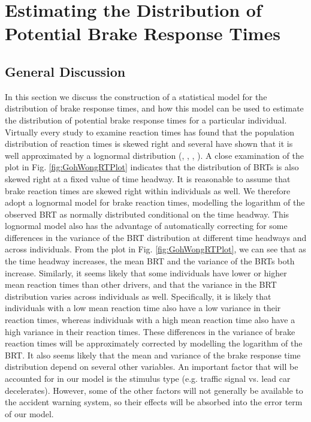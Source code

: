 \documentclass[conference]{IEEEtran}
\begin{document}
\section{Estimating the Distribution of Potential Brake Response Times}
\label{estimation}

\subsection{General Discussion}

In this section we discuss the construction of a statistical model for the distribution of brake response times, and how this model can be used to estimate the distribution of potential brake response times for a particular individual.
Virtually every study to examine reaction times has found that the population distribution of reaction times is skewed right and several have shown that it is well approximated by a lognormal distribution (\cite{GohWong:DriverPRTDuringSignalChange}, \cite{Koppa:HumanFactors}, \cite{MaxwellWood:ReviewTrafficSignal},
\cite{ZhangBham:EstDriverRT}).  A close examination of the plot in Fig. \ref{fig:GohWongRTPlot} indicates that the distribution of BRTs is also skewed right at a fixed value of time headway.
It is reasonable to assume that brake reaction times are skewed right within individuals as well.  We therefore adopt a lognormal model for brake reaction times, modelling the logarithm of the observed BRT as normally distributed conditional on the time headway.
This lognormal model also has the advantage of automatically correcting for some differences in the variance of the BRT distribution at different time headways and across individuals.  From the plot in Fig. \ref{fig:GohWongRTPlot}, we can see that as the time headway increases, the mean BRT and the variance of the BRTs both increase.  Similarly, it seems likely that some individuals have lower or higher mean reaction times than other drivers, and that the variance in the BRT distribution varies across individuals as well.  Specifically, it is likely that individuals with a low mean reaction time also have a low variance in their reaction times, whereas individuals with a high mean reaction time also have a high variance in their reaction times.  These differences in the variance of brake reaction times will be approximately corrected by modelling the logarithm of the BRT.
It also seems likely that the mean and variance of the brake response time distribution depend on several other variables.  An important factor that will be accounted for in our model is the stimulus type (e.g. traffic signal vs. lead car decelerates).
However,
some of the other factors will not generally be available to the accident warning system, so their effects will be absorbed into the error term of our model.
\end{document}
